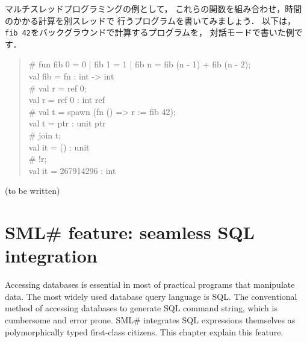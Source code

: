 \documentclass{jbook}
\newif\ifjp
\newcommand{\txt}[2]{#2}
\newcommand{\smlsharp}{SML\#}
\newenvironment{program}{\begin{quote}\begin{tt}}%
                        {\end{tt}\end{quote}}
\begin{document}
	マルチスレッドプログラミングの例として，
これらの関数を組み合わせ，時間のかかる計算を別スレッドで
行うプログラムを書いてみましょう．
	以下は，{\tt fib 42}をバックグラウンドで計算するプログラムを，
対話モードで書いた例です．
\begin{program}
\# fun fib 0 = 0 | fib 1 = 1 | fib n = fib (n - 1) + fib (n - 2);\\
val fib = fn : int -> int\\
\# val r = ref 0;\\
val r = ref 0 : int ref\\
\# val t = spawn (fn () => r := fib 42);\\
val t = ptr : unit ptr\\
\# join t;\\
val it = () : unit\\
\# !r;\\
val it = 267914296 : int
\end{program}

\else%
(to be written)
\fi%

\chapter{
\txt{\smlsharp{}の拡張機能：SQLのシームレスな統合}
{\smlsharp{} feature: seamless SQL integration}
}
\label{chap:tutorialDatabase}

\ifjp%
	データを扱う実用的なプログラムを書くためには，データベースシステ
ムとの連携が必要です．
	現在もっとも普及しているデータベースシステムは，問い合わせ言語
SQLを用いて操作します．
	種々のプログラミング言語で，データベース操作のためのマクロや関数
が提供されていますが，データベースを使いこなす本格的なプログラムを書くた
めには，SQL言語そのものを使いデータベースシステムを呼び出すコードを各必
要があります． 
	これまでの方法は，SQL文字列を生成するコードを書き，サーバに送る
ことでしたが，\smlsharp{}では，SQLそのものを型を持つ（したがって第一級の）
式として書くことができます．
	本節では，その利用方法を学びます．
\else%
	Accessing databases is essential in most of practical programs
that manipulate data.
	The most widely used database query language is SQL.
	The conventional method of accessing databases to generate SQL
command string, which is cumbersome and error prone.
	\smlsharp{} integrates SQL expressions themselves as
polymorphically typed first-class citizens.
	This chapter explain this feature.
\fi%
	
\end{document}
